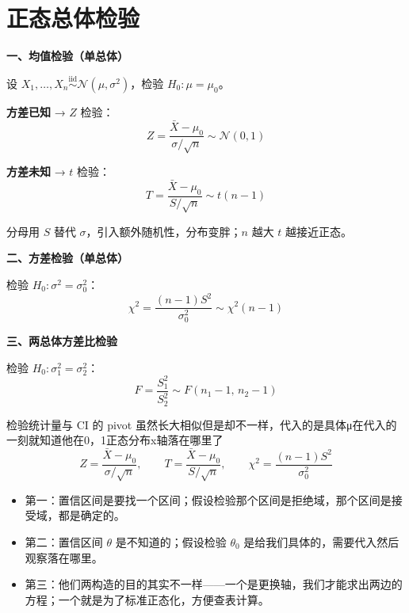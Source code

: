 \section{正态总体检验}
\begin{theorem}[假设检验统计量选择]

\textbf{一、均值检验（单总体）}

设 $X_1, \ldots, X_n \overset{\text{iid}}{\sim} \mathcal{N}(\mu, \sigma^2)$，检验 $H_0: \mu = \mu_0$。

\textbf{方差已知} → $Z$ 检验：
$$Z = \frac{\bar{X} - \mu_0}{\sigma/\sqrt{n}} \sim \mathcal{N}(0,1)$$

\textbf{方差未知} → $t$ 检验：
$$T = \frac{\bar{X} - \mu_0}{S/\sqrt{n}} \sim t(n-1)$$

分母用 $S$ 替代 $\sigma$，引入额外随机性，分布变胖；$n$ 越大 $t$ 越接近正态。

\textbf{二、方差检验（单总体）}

检验 $H_0: \sigma^2 = \sigma_0^2$：
$$\chi^2 = \frac{(n-1)S^2}{\sigma_0^2} \sim \chi^2(n-1)$$

\textbf{三、两总体方差比检验}

检验 $H_0: \sigma_1^2 = \sigma_2^2$：
$$F = \frac{S_1^2}{S_2^2} \sim F(n_1-1,\, n_2-1)$$

\end{theorem}
检验统计量与 CI 的 pivot 虽然长大相似但是却不一样，代入的是具体μ在代入的一刻就知道他在0，1正态分布x轴落在哪里了
$$Z = \frac{\bar{X} - \mu_0}{\sigma/\sqrt{n}}, \qquad
T = \frac{\bar{X} - \mu_0}{S/\sqrt{n}}, \qquad
\chi^2 = \frac{(n-1)S^2}{\sigma_0^2}$$
\begin{dxtips}
    \begin{itemize}
    \item 第一：置信区间是要找一个区间；假设检验那个区间是拒绝域，那个区间是接受域，都是确定的。
    \item 第二：置信区间 $\theta$ 是不知道的；假设检验 $\theta_0$ 是给我们具体的，需要代入然后观察落在哪里。
    \item 第三：他们两构造的目的其实不一样——一个是更换轴，我们才能求出两边的方程；一个就是为了标准正态化，方便查表计算。
\end{itemize}
\end{dxtips}

